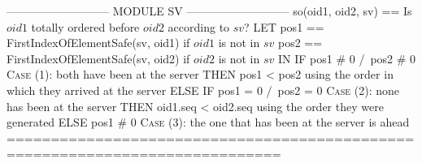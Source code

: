 \documentclass[preview, border={5pt 0pt 5pt 1pt}]{standalone}
\begin{document}
\begin{tla}
--------------------------- MODULE SV ---------------------------
so(oid1, oid2, sv) == \* Is $oid1$ totally ordered before $oid2$ according to $sv$?
    LET pos1 == FirstIndexOfElementSafe(sv, oid1)  if $oid1$ is not in $sv$
        pos2 == FirstIndexOfElementSafe(sv, oid2)  if $oid2$ is not in $sv$
    IN IF pos1 # 0 /\ pos2 # 0 \* \textsc{Case} (1): both have been at the server
       THEN pos1 < pos2        \* using the order in which they arrived at the server
       ELSE IF pos1 = 0 /\ pos2 = 0  \* \textsc{Case} (2): none has been at the server
            THEN oid1.seq < oid2.seq \* using the order they were generated
            ELSE pos1 # 0 \* \textsc{Case} (3): the one that has been at the server is ahead
=============================================================================
\end{tla}
\begin{tlatex}
\@x{}\moduleLeftDash{}\moduleRightDash\@xx{}%
%
%
\@xx{}%
%
\@xx{}%
%
%
\@xx{}%
%
%
\@xx{}%
%
%
\@xx{}%
%
%
\@xx{}%
%
%
\@xx{}%
%
%
\@xx{}%
\@x{}\bottombar\@xx{}%
\end{tlatex}
\end{document}
